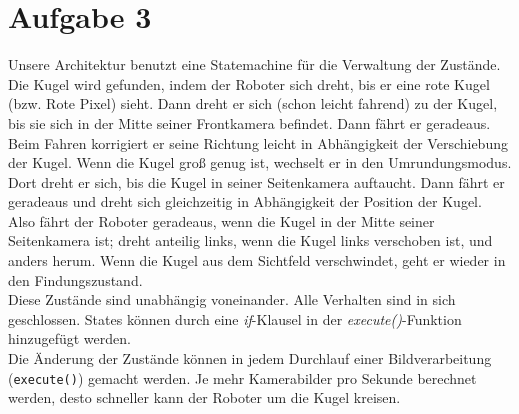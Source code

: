 \documentclass{../Vorlage/mat}
\begin{document}
\section*{Aufgabe 3}
Unsere Architektur benutzt eine Statemachine für die Verwaltung der Zustände.
Die Kugel wird gefunden, indem der Roboter sich dreht, bis er eine rote Kugel (bzw. Rote Pixel) sieht. Dann dreht er sich (schon leicht fahrend) zu der Kugel, bis sie sich in der Mitte seiner Frontkamera befindet. Dann fährt er geradeaus. Beim Fahren korrigiert er seine Richtung leicht in Abhängigkeit der Verschiebung der Kugel. Wenn die Kugel groß genug ist, wechselt er in den Umrundungsmodus. Dort dreht er sich, bis die Kugel in seiner Seitenkamera auftaucht. Dann fährt er geradeaus und dreht sich gleichzeitig in Abhängigkeit der Position der Kugel. Also fährt der Roboter geradeaus, wenn die Kugel in der Mitte seiner Seitenkamera ist; dreht anteilig links, wenn die Kugel links verschoben ist, und anders herum. Wenn die Kugel aus dem Sichtfeld verschwindet, geht er wieder in den Findungszustand.\\
Diese Zustände sind unabhängig voneinander. Alle Verhalten sind in sich geschlossen. States können durch eine \textit{if}-Klausel in der \textit{execute()}-Funktion hinzugefügt werden. \\
Die Änderung der Zustände können in jedem Durchlauf einer Bildverarbeitung (\texttt{execute()}) gemacht werden. Je mehr Kamerabilder pro Sekunde berechnet werden, desto schneller kann der Roboter um die Kugel kreisen.
\end{document}
